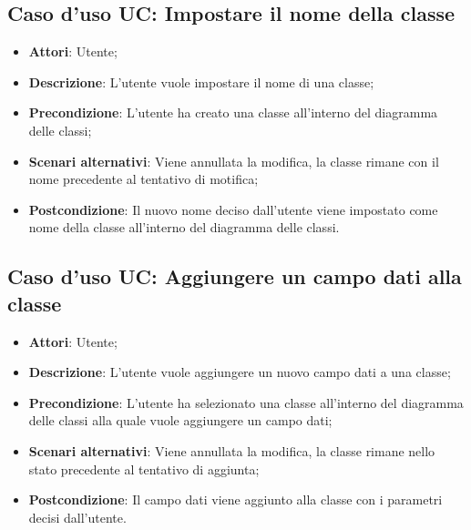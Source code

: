 \documentclass[../AnalisiDeiRequisiti.tex]{subfiles}
\begin{document}
			\subsection{Caso d'uso UC: Impostare il nome della classe}
			\begin{itemize}
				\item \textbf{Attori}: Utente;
				
				\item \textbf{Descrizione}: L'utente vuole impostare il nome di una classe;
				
				\item \textbf{Precondizione}: L'utente ha creato una classe all'interno del diagramma delle classi;
				
				\item \textbf{Scenari alternativi}: Viene annullata la modifica, la classe
				rimane con il nome precedente al tentativo di motifica;
				
				\item \textbf{Postcondizione}: Il nuovo nome deciso dall'utente viene impostato come nome della classe all'interno del diagramma delle classi.
			\end{itemize}
			
			\subsection{Caso d'uso UC: Aggiungere un campo dati alla classe}
			\begin{itemize}
				\item \textbf{Attori}: Utente;
				
				\item \textbf{Descrizione}: L'utente vuole aggiungere un nuovo campo dati a una classe;
				
				\item \textbf{Precondizione}: L'utente ha selezionato una classe all'interno del diagramma delle classi alla quale vuole aggiungere un campo dati;
				
				\item \textbf{Scenari alternativi}: Viene annullata la modifica, la classe
				rimane nello stato precedente al tentativo di aggiunta;
				
				\item \textbf{Postcondizione}: Il campo dati viene aggiunto alla classe con i parametri decisi dall'utente.
			\end{itemize}
			
\end{document}
